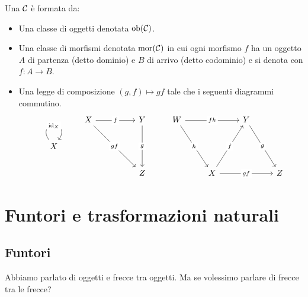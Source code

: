 \documentclass{article}
\begin{document}
\begin{definition}
    Una  $\mathcal{C}$ è formata da:
    \begin{itemize}
        \item Una classe di oggetti denotata $\operatorname{ob}(\mathcal{C})$.
        \item Una classe di morfismi denotata $\operatorname{mor}(\mathcal{C})$ in cui ogni morfismo $f$ ha un oggetto $A$ di partenza (detto dominio) e $B$ di arrivo (detto codominio) e si denota con $f:A\to B$.
        \item Una legge di composizione $(g,f)\mapsto gf$ tale che i seguenti diagrammi commutino.
        \[\begin{tikzcd}
            & X && Y & W && Y \\
            X \\
            &&& Z && X && Z
            \arrow["f"{description}, from=1-2, to=1-4]
            \arrow["gf"{description}, from=1-2, to=3-4]
            \arrow["g"{description}, from=1-4, to=3-4]
            \arrow["fh"{description}, from=1-5, to=1-7]
            \arrow["h"{description}, from=1-5, to=3-6]
            \arrow["g"{description}, from=1-7, to=3-8]
            \arrow["{\id{X}}"{description}, from=2-1, to=2-1, loop, in=55, out=125, distance=10mm]
            \arrow["f"{description}, from=3-6, to=1-7]
            \arrow["gf"{description}, from=3-6, to=3-8]
        \end{tikzcd}\]
    \end{itemize}
\end{definition}

\section{Funtori e trasformazioni naturali}
\label{Sec:Functors}

\subsection{Funtori}

Abbiamo parlato di oggetti e frecce tra oggetti. Ma se volessimo parlare di frecce tra le frecce?
\end{document}
